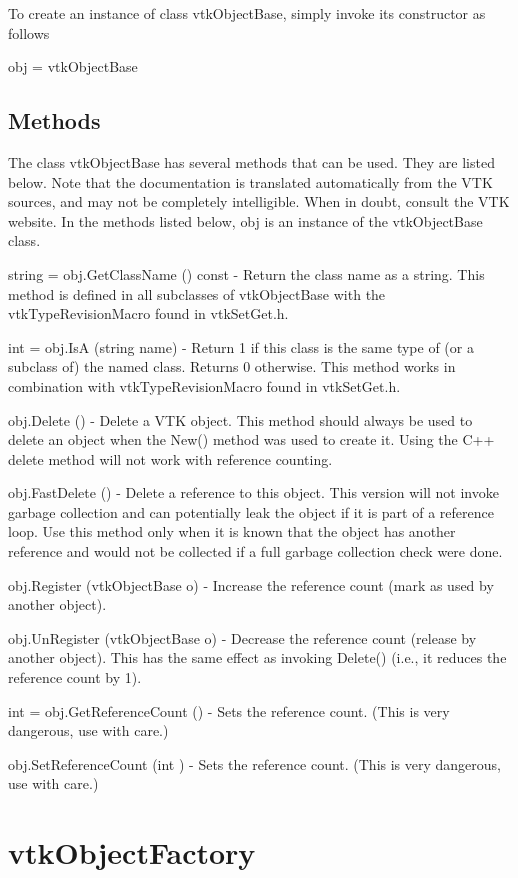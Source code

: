 To create an instance of class vtk\-Object\-Base, simply invoke its constructor as follows \begin{DoxyVerb}  obj = vtkObjectBase
\end{DoxyVerb}
 \hypertarget{vtkwidgets_vtkxyplotwidget_Methods}{}\subsection{Methods}\label{vtkwidgets_vtkxyplotwidget_Methods}
The class vtk\-Object\-Base has several methods that can be used. They are listed below. Note that the documentation is translated automatically from the V\-T\-K sources, and may not be completely intelligible. When in doubt, consult the V\-T\-K website. In the methods listed below, {\ttfamily obj} is an instance of the vtk\-Object\-Base class. 
\begin{DoxyItemize}
\item {\ttfamily string = obj.\-Get\-Class\-Name () const} -\/ Return the class name as a string. This method is defined in all subclasses of vtk\-Object\-Base with the vtk\-Type\-Revision\-Macro found in vtk\-Set\-Get.\-h.  
\item {\ttfamily int = obj.\-Is\-A (string name)} -\/ Return 1 if this class is the same type of (or a subclass of) the named class. Returns 0 otherwise. This method works in combination with vtk\-Type\-Revision\-Macro found in vtk\-Set\-Get.\-h.  
\item {\ttfamily obj.\-Delete ()} -\/ Delete a V\-T\-K object. This method should always be used to delete an object when the New() method was used to create it. Using the C++ delete method will not work with reference counting.  
\item {\ttfamily obj.\-Fast\-Delete ()} -\/ Delete a reference to this object. This version will not invoke garbage collection and can potentially leak the object if it is part of a reference loop. Use this method only when it is known that the object has another reference and would not be collected if a full garbage collection check were done.  
\item {\ttfamily obj.\-Register (vtk\-Object\-Base o)} -\/ Increase the reference count (mark as used by another object).  
\item {\ttfamily obj.\-Un\-Register (vtk\-Object\-Base o)} -\/ Decrease the reference count (release by another object). This has the same effect as invoking Delete() (i.\-e., it reduces the reference count by 1).  
\item {\ttfamily int = obj.\-Get\-Reference\-Count ()} -\/ Sets the reference count. (This is very dangerous, use with care.)  
\item {\ttfamily obj.\-Set\-Reference\-Count (int )} -\/ Sets the reference count. (This is very dangerous, use with care.)  
\end{DoxyItemize}\hypertarget{vtkcommon_vtkobjectfactory}{}\section{vtk\-Object\-Factory}\label{vtkcommon_vtkobjectfactory}
